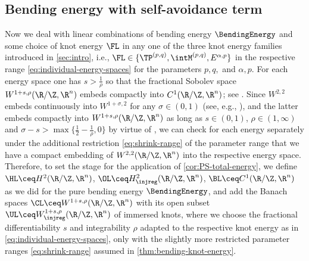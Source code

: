 \subsection{Bending energy with self-avoidance term}
\label{sec:PS-elastic-knot}
Now we deal with linear combinations of bending energy $\BendingEnergy$ and some choice
of knot energy $\FL$ in any one of the three knot energy families introduced
in \cref{sec:intro}, i.e., 
$\FL\in\{\TP^{(p,q)},\intM^{(p,q)},E^{\alpha,p}\}$ 
in the respective range \cref{eq:individual-energy-spaces}
for the parameters $p,q,$ and $\alpha,p$. 
For each energy space
 one has $s>\frac1{\rho}$ so that the fractional Sobolev
space $W^{1+s,\rho}(\R/\Z,\R^n)$
embeds compactly into $C^1(\R/\Z,\R^n)$; see
\cite[Theorem A.2]{knappmann-etal_2023}. Since $W^{2,2}$ embeds 
continuously into $W^{1+\sigma,2}$ for any $\sigma\in (0,1)$ (see, e.g.,
\cite[Lemma 2.20]{steenebruegge_2023}), and the latter embeds
compactly into $W^{1+s,\rho}(\R/\Z,\R^n)$ as long as
$s\in (0,1)$, $\rho\in (1,\infty)$ and $\sigma-s >\max\{
\frac{1}{2}-\frac1{\rho},0\}$ by virtue of \cite[Proposition A.3(i)]{matt-etal_2023},
we can check for each energy separately 
under the additional restriction \cref{eq:shrink-range}
of the parameter range that we
have a compact embedding of $W^{2,2}(\R/\Z,\R^n)$ into
the respective energy space. Therefore, to set the stage for the application of \cref{cor:PS-total-energy}, we define $\HL \ceq H^2(\R/\Z,\R^n)$,
$\OL \ceq H^2_\injreg(\R/\Z,\R^n)$, $\BL \ceq C^1(\R/\Z,\R^n)$ as we did
for the pure bending energy $\BendingEnergy$, and add the Banach spaces
$\CL \ceq W^{1+s,\rho}(\R/\Z,\R^n)$ with its open subset $\UL\ceq
W^{1+s,\rho}_\injreg(\R/\Z,\R^n)$ of immersed knots, where we choose
the fractional differentiability $s$ and integrability $\rho$ adapted to
the respective knot energy as in \cref{eq:individual-energy-spaces}, only
with the slightly more restricted parameter ranges \cref{eq:shrink-range}
assumed in \cref{thm:bending-knot-energy}.

